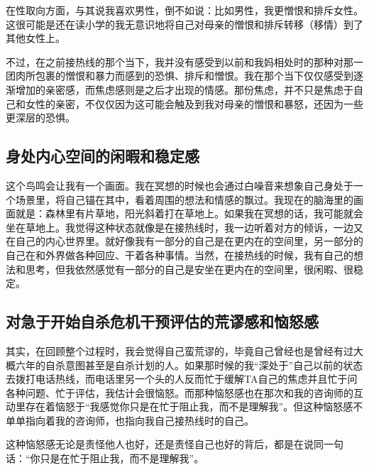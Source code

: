 在性取向方面，与其说我喜欢男性，倒不如说：比如男性，我更憎恨和排斥女性。这很可能是还在读小学的我无意识地将自己对母亲的憎恨和排斥转移（移情）到了其他女性上。

不过，在之前接热线的那个当下，我并没有感受到以前和我妈相处时的那种对那一团肉所包裹的憎恨和暴力而感到的恐惧、排斥和憎恨。我在那个当下仅仅感受到逐渐增加的亲密感，而焦虑感则是之后才出现的情感。那份焦虑，并不只是焦虑于自己和女性的亲密，不仅仅因为这可能会触及到我对母亲的憎恨和暴怒，还因为一些更深层的恐惧。







\subsection*{身处内心空间的闲暇和稳定感}

这个鸟鸣会让我有一个画面。我在冥想的时候也会通过白噪音来想象自己身处于一个场景里，将自己锚在其中，看着周围的想法和情感的飘过。我现在的脑海里的画面就是：森林里有片草地，阳光斜着打在草地上。如果我在冥想的话，我可能就会坐在草地上。我觉得这种状态就像是在接热线时，我一边听着对方的倾诉，一边又在自己的内心世界里。就好像我有一部分的自己是在更内在的空间里，另一部分的自己在和外界做各种回应、干着各种事情。当然，在接热线的时候，我有自己的想法和思考，但我依然感觉有一部分的自己是安坐在更内在的空间里，很闲暇、很稳定。







\subsection*{对急于开始自杀危机干预评估的荒谬感和恼怒感}

其实，在回顾整个过程时，我会觉得自己蛮荒谬的，毕竟自己曾经也是曾经有过大概六年的自杀意图甚至是自杀计划的人。如果那时候的我“深处于”自己以前的状态去拨打电话热线，而电话里另一个头的人反而忙于缓解TA自己的焦虑并且忙于问各种问题、忙于评估，我估计会很恼怒。而那种恼怒感也在那次和我的咨询师的互动里存在着\pozhehao{}恼怒于“我感觉你只是在忙于阻止我，而不是理解我”。但这种恼怒感不单单指向着我的咨询师，也指向我自己\pozhehao{}接热线时的自己。

这种恼怒感\pozhehao{}无论是责怪他人也好，还是责怪自己也好\pozhehao{}的背后，都是在说同一句话：“你只是在忙于阻止我，而不是理解我”。

